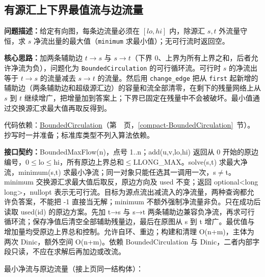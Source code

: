 \subsection{有源汇上下界最值流与边流量}\label{compact-BoundedMaxFlow}

\noindent\textbf{问题描述：}\allowbreak 给定有向图，每条边流量必须在 $[lo,hi]$ 内，除源汇 $s,t$ 外流量守恒，求 $s$ 净流出量的最大值（\texttt{minimum} 求最小值）；无可行流时返回空。

\textbf{核心思路：}\allowbreak 加两条辅助边 $t\to s$ 与 $s\to t$（下界 0、上界为所有上界之和，后者允许净流为负），问题化为 \texttt{BoundedCirculation} 的可行循环流。可行时 $s$ 的净流出等于 $t\to s$ 的流量减去 $s\to t$ 的流量。然后用 \texttt{change\_edge} 把从 \texttt{first} 起新增的辅助边（两条辅助边和超级源汇边）的容量和流全部清零，在剩下的残量网络上从 $s$ 到 $t$ 继续增广，把增量加到答案上；下界已固定在残量中不会被破坏。最小值通过交换源汇求最大值再取反得到。

代码依赖：\hyperref[compact-BoundedCirculation]{BoundedCirculation}（第~\pageref{compact-BoundedCirculation}~页，\ref{compact-BoundedCirculation}~节）。抄写时一并准备；标准库类型不列入算法依赖。

{\sloppy{}\noindent\textbf{接口契约：}BoundedMaxFlow(n)，点号 1..n；add(u,v,lo,hi) 返回从 0 开始的原边编号，0$\le$lo$\le$hi，所有原边上界总和$\le$LLONG\_MAX。solve(s,t) 求最大净流，minimum(s,t) 求最小净流；同一对象只能任选其一调用一次，s$\ne$t。minimum 交换源汇求最大值后取反，原边方向及 used 不变；返回 optional<long long>，nullopt 表示无可行流。目标为源点流出减流入的净流量，两种查询都允许负答案，不能把 -1 直接当无解；minimum 不额外强制净流量非负。只在成功后读取 used(id) 的原边方案。先加 t→s 与 s→t 两条辅助边兼容负净流，再求可行循环流；保存净值后清空全部辅助残量边，最后在原图从 s 到 t 增广。最优值与增加量均受原边上界总和控制。允许自环、重边；构建和清理 O(n+m)，主体为两次 Dinic，额外空间 O(n+m)。依赖 BoundedCirculation 与 Dinic，二者内部字段只读，不应在求解后再加边或改流。\par}

\Needspace{440pt}



\newpage

\noindent 最小净流与原边流量（接上页同一结构体）：



\Needspace{548pt}

